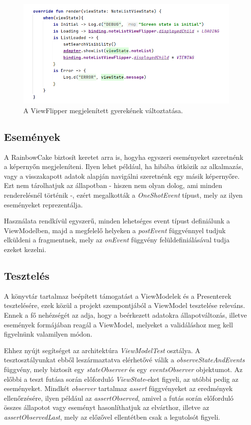 \begin{figure}[!ht]
	\centering
	\includegraphics[width=150mm, keepaspectratio]{figures/view_flipper_usage.png}
	\caption{A ViewFlipper megjelenített gyerekének változtatása.}
	\label{fig:ViewFlipperUsage}
\end{figure}

\subsection{Események}
A RainbowCake biztosít keretet arra is, hogyha egyszeri eseményeket szeretnénk a képernyőn megjeleníteni. Ilyen lehet például, ha hibába ütközik az alkalmazás, vagy a visszakapott adatok alapján navigálni szeretnénk egy másik képernyőre. Ezt nem tárolhatjuk az állapotban - hiszen nem olyan dolog, ami minden renderelésnél történik -, ezért megalkották a \emph{OneShotEvent} típust, mely az ilyen eseményeket reprezentálja. \cite{Events}

Használata rendkívül egyszerű, minden lehetséges event típust definiálunk a ViewModelben, majd a megfelelő helyeken a \emph{postEvent} függvénnyel tudjuk elküldeni a fragmentnek, mely az \emph{onEvent} függvény felüldefiniálásával tudja ezeket kezelni. 

\subsection{Tesztelés}
A könyvtár tartalmaz beépített támogatást a ViewModelek és a Presenterek tesztelésére, ezek közül a projekt szempontjából a ViewModel tesztelése releváns. Ennek a fő nehézségét az adja, hogy a beérkezett adatokra állapotváltozás, illetve események formájában reagál a ViewModel, melyeket a validáláshoz meg kell figyelnünk valamilyen módon. \cite{RainbowcakeTest}

Ehhez nyújt segítséget az architektúra \emph{ViewModelTest} osztálya. A tesztosztályunkat ebből leszármaztatva elérhetővé válik a \emph{observeStateAndEvents} függvény, mely biztosít egy \emph{stateObserver} és egy \emph{eventsObserver} objektumot. Az előbbi a teszt futása során előforduló \emph{ViewState}-eket figyeli, az utóbbi pedig az eseményeket. Mindkét \emph{observer} tartalmaz \emph{assert} függvényeket az eredmények ellenőrzésére, ilyen például az \emph{assertObserved}, amivel a futás során előforduló összes állapotot vagy eseményt hasonlíthatjuk az elvárthoz, illetve az \emph{assertObservedLast}, mely az előzővel ellentétben csak a legutolsót figyeli.
